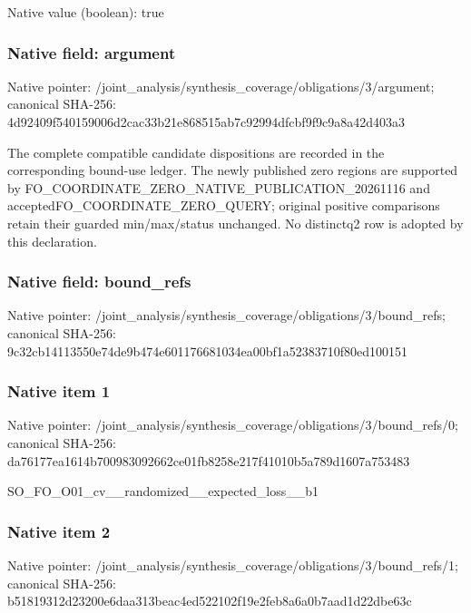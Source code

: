 \documentclass[10pt,a4paper]{article}
\begin{document}
Native value (boolean): true

\subsubsection{Native field: argument}
Native pointer: /joint\_\allowbreak{}analysis/synthesis\_\allowbreak{}coverage/obligations/3/argument; canonical SHA-256: 4d92409f540159006d2cac33b21e868515ab7c92994dfcbf9f9c9a8a42d403a3

\begingroup\raggedright\sloppy The complete compatible candidate dispositions are recorded in the corresponding bound-use ledger. The newly published zero regions are supported by FO\_\allowbreak{}COORDINATE\_\allowbreak{}ZERO\_\allowbreak{}NATIVE\_\allowbreak{}PUBLICATION\_\allowbreak{}20261116 and acceptedFO\_\allowbreak{}COORDINATE\_\allowbreak{}ZERO\_\allowbreak{}QUERY;\allowbreak{} original positive comparisons retain their guarded min/\allowbreak{}max/\allowbreak{}status unchanged. No distinctq2 row is adopted by this declaration.\par\endgroup

\subsubsection{Native field: bound\_\allowbreak{}refs}
Native pointer: /joint\_\allowbreak{}analysis/synthesis\_\allowbreak{}coverage/obligations/3/bound\_\allowbreak{}refs; canonical SHA-256: 9c32cb14113550e74de9b474e601176681034ea00bf1a52383710f80ed100151

\subsubsection{Native item 1}
Native pointer: /joint\_\allowbreak{}analysis/synthesis\_\allowbreak{}coverage/obligations/3/bound\_\allowbreak{}refs/0; canonical SHA-256: da76177ea1614b700983092662ce01fb8258e217f41010b5a789d1607a753483

\begingroup\raggedright\sloppy SO\_\allowbreak{}FO\_\allowbreak{}O01\_\allowbreak{}cv\_\allowbreak{}\_\allowbreak{}randomized\_\allowbreak{}\_\allowbreak{}expected\_\allowbreak{}loss\_\allowbreak{}\_\allowbreak{}b1\par\endgroup

\subsubsection{Native item 2}
Native pointer: /joint\_\allowbreak{}analysis/synthesis\_\allowbreak{}coverage/obligations/3/bound\_\allowbreak{}refs/1; canonical SHA-256: b51819312d23200e6daa313beac4ed522102f19e2feb8a6a0b7aad1d22dbe63c
\end{document}
